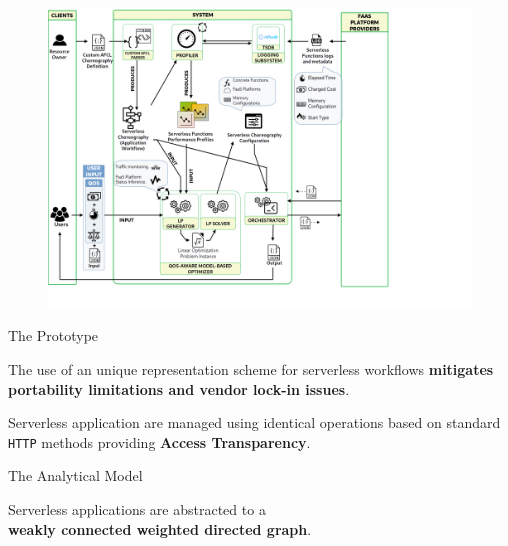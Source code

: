 \documentclass[13.5pt]{beamer}
\newcommand{\B}[1]{\textcolor{TorVergataColor}{\textbf{#1}}}
\begin{document}
\begin{frame}

\begin{figure}[h]
	\centering
	\includegraphics[width=\textwidth]{../Images/SystemForSlide.png}
\end{figure}


\end{frame} 
\begin{frame}{The Prototype}
	
	\begin{block}{}
		\centering
		The use of an unique representation scheme for serverless workflows \B{mitigates portability limitations and vendor lock-in issues}.
	\end{block}

	\vspace{\baselineskip}

	\begin{block}{}
		\centering
		Serverless application are managed using identical operations based on standard \texttt{HTTP} methods providing \B{Access Transparency}.
	\end{block}

\end{frame} 
\begin{frame}{The Analytical Model}
	
	\begin{block}{}
		\centering
		Serverless applications are abstracted to a \\\B{weakly connected weighted directed graph}.
	\end{block}
	

	
\end{frame} 
\end{document}
